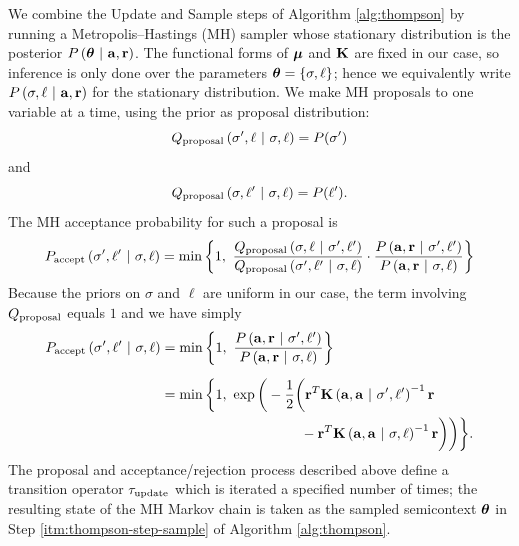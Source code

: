 We combine the Update and Sample steps of Algorithm \ref{alg:thompson} by
running a Metropolis--Hastings (MH) sampler whose stationary distribution is the
posterior $P\left( \bm{\theta} \ \middle\vert\  \mathbf{a}, \mathbf{r} \right)$.  The functional forms of
$\bm{\mu}$ and $\mathbf{K}$ are fixed in our case, so inference is only done
over the parameters $\bm{\theta} = \left\{ \sigma,\ell \right\}$; hence we equivalently write
$P\left( \sigma,\ell \ \middle\vert\  \mathbf{a}, \mathbf{r} \right)$ for the stationary
distribution.  We make MH proposals to one variable at a time, using the prior
as proposal distribution:
\[
  Q_{\textrm{proposal}}\left( \sigma',\ell \ \middle\vert\  \sigma,\ell \right) = P(\sigma')
\]
and
\[
  Q_{\textrm{proposal}}\left( \sigma,\ell' \ \middle\vert\  \sigma,\ell \right) = P(\ell').
\]
The MH acceptance probability for such a proposal is
\[
  P_{\textrm{accept}}\left( \sigma',\ell' \ \middle\vert\  \sigma,\ell \right)
  =
  \min\left\{ 1,\ \frac{
    Q_{\textrm{proposal}}\left( \sigma,\ell \ \middle\vert\  \sigma',\ell' \right)
    }{
    Q_{\textrm{proposal}}\left( \sigma',\ell' \ \middle\vert\  \sigma,\ell \right)
    }
  \cdot
  \frac{
    P\left( \mathbf{a},\mathbf{r} \ \middle\vert\  \sigma',\ell' \right)
    }{
    P\left( \mathbf{a},\mathbf{r} \ \middle\vert\  \sigma,\ell \right)
    } \right\}
\]
Because the priors on $\sigma$ and $\ell$ are uniform in our case, the term
involving $Q_{\textrm{proposal}}$ equals $1$ and we have simply
\begin{align*}
  P_{\textrm{accept}}\left( \sigma',\ell' \ \middle\vert\  \sigma,\ell \right)
  &=
  \min\left\{ 1,\ \frac{
    P\left( \mathbf{a},\mathbf{r} \ \middle\vert\  \sigma',\ell' \right)
    }{
    P\left( \mathbf{a},\mathbf{r} \ \middle\vert\  \sigma,\ell \right)
    } \right\} \\[2mm]
  &=
  \min\bigg\{1,\ \exp\bigg( -\frac12\bigg(
    \mathbf{r}^T \mathbf{K}\left( \mathbf{a}, \mathbf{a} \ \middle\vert\  \sigma', \ell' \right)^{-1} \mathbf{r} \\
  & \qquad\qquad\qquad\qquad\qquad -
    \mathbf{r}^T \mathbf{K}\left( \mathbf{a}, \mathbf{a} \ \middle\vert\  \sigma, \ell \right)^{-1} \mathbf{r}
  \bigg)\bigg)\bigg\}.
\end{align*}
The proposal and acceptance/rejection process described above define a
transition operator $\tau_{\textrm{update}}$ which is iterated a specified number of
times; the resulting state of the MH Markov chain is taken as the sampled
semicontext $\bm{\theta}$ in Step \ref{itm:thompson-step-sample} of Algorithm
\ref{alg:thompson}.

